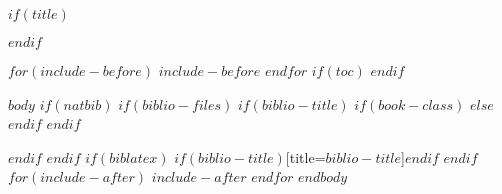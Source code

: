 \documentclass[$if(fontsize)$$fontsize$,$endif$$if(lang)$$lang$,$endif$]{$documentclass$}
\author{$for(author)$$author$$sep$ \and $endfor$}
\date{$date$}
\begin{document}
	$if(title)$
		\maketitle
	$endif$

	\newpage

	$for(include-before)$ $include-before$ $endfor$
	$if(toc)$
	{
		\hypersetup{linkcolor=black}
		\setcounter{tocdepth}{$toc-depth$}
		\setcounter{secnumdepth}{$toc-depth$}
		\tableofcontents
	}
	$endif$

	\newpage

	$body$
		$if(natbib)$
			$if(biblio-files)$
				$if(biblio-title)$
					$if(book-class)$
						\renewcommand\bibname{$biblio-title$}
					$else$
						\renewcommand\refname{$biblio-title$}
					$endif$
				$endif$
				
			$endif$
		$endif$
		$if(biblatex)$
			\printbibliography$if(biblio-title)$[title=$biblio-title$]$endif$
		$endif$
		$for(include-after)$
			$include-after$
		$endfor$
	$endbody$
\end{document}
